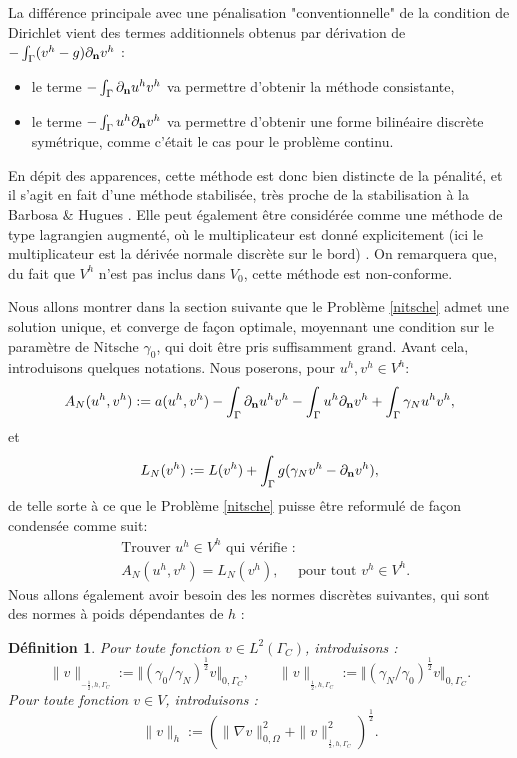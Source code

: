 \documentclass[11pt]{book}
\newtheorem{definition}[theorem]{Définition}
\def\n{{\bf n}}
\newcommand{\Gc}{\Gamma_{C}}
\newcommand{\dnu}{\partial_{\n} u}
\newcommand{\dnv}{\partial_{\n} v}
\newcommand{\nngc}[1]{\|{#1}\|_{_{-\frac12,h,\Gc}}}
\newcommand{\npgc}[1]{\|{#1}\|_{_{\frac12,h,\Gc}}}
\begin{document}
 La différence principale avec une pénalisation "conventionnelle" de la condition de Dirichlet vient des termes additionnels obtenus par dérivation de 
 $-  \int_\Gamma ( v^h  - g ) \dnv^h$ :
 \begin{itemize}
  \item le terme $- \int_\Gamma \dnu^h v^h$ va permettre d'obtenir la méthode consistante,
  \item le terme $- \int_\Gamma u^h \dnv^h$ va permettre d'obtenir une forme bilinéaire discrète symétrique, comme c'était le cas pour le problème continu.
 \end{itemize}
En dépit des apparences, cette méthode est donc bien distincte de la pénalité, et il s'agit en fait d'une méthode stabilisée, très proche de la stabilisation à la Barbosa \& Hugues \cite{juntunen-2015,stenberg-95}. Elle peut également être considérée comme une méthode de type lagrangien augmenté, où le multiplicateur est donné explicitement (ici le multiplicateur est la dérivée normale discrète sur le bord) \cite{burman-hansbo-2017}. On remarquera que, du fait que $V^h$ n'est pas inclus dans $V_0$, cette méthode est non-conforme.

Nous allons montrer dans la section suivante que le Problème \eqref{nitsche} admet une solution unique, et converge de façon optimale, moyennant une condition sur le paramètre de Nitsche $\gamma_0$, qui doit être pris suffisamment grand. %
%
 Avant cela, introduisons quelques notations. Nous poserons, pour $u^h, v^h \in V^h$:
 \[
  A_N ( u^h , v^h ) := a(u^h,v^h) - \int_\Gamma \dnu^h v^h - \int_\Gamma u^h \dnv^h + \int_\Gamma \gamma_N u^h v^h,
 \]
 et 
 \[
  L_N ( v^h ) := L(v^h) + \int_\Gamma  g ( \gamma_N v^h - \dnv^h ),
 \]
 de telle sorte à ce que le Problème \eqref{nitsche} puisse être reformulé de façon condensée comme suit:
 \begin{align} 
\label{nitsche2}
&\textrm{Trouver } u^h \in V^h \textrm{ qui vérifie :}\nonumber\\
&%
 A_N ( u^h , v^h ) = L_N (v^h), \quad \textrm{ pour tout } v^h \in V^h.
\end{align}
Nous allons également avoir besoin des les normes discrètes suivantes, qui sont des normes à poids dépendantes de $h$ :
\begin{definition}
Pour toute fonction $v \in L^2(\Gamma_C)$, introduisons :
$$
\nngc{v}
:= \Vert 
\left({\gamma_0}/{\gamma_N}\right)^{\frac12}
v \Vert_{0,\Gamma_C}, \qquad
\npgc{v}
:= \Vert 
\left({\gamma_N}/{\gamma_0}\right)^{\frac12}
v \Vert_{0,\Gamma_C}.
$$
Pour toute fonction $v \in V$, introduisons :
$$
\| v \|_h := \left ( \| \nabla v \|^2_{0,\Omega} + \npgc{v}^2 \right )^{\frac12}.
$$
\end{definition}
\end{document}
